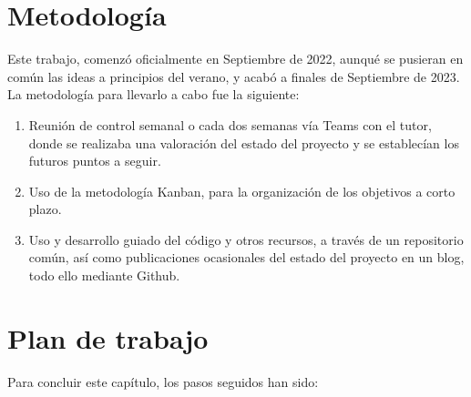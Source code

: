 \section{Metodología}
\label{sec:metodologia}

Este trabajo, comenzó oficialmente en Septiembre de 2022, aunqué se pusieran en común las ideas a principios del verano, y acabó a finales de Septiembre de 2023. La metodología para llevarlo a cabo fue la siguiente:

\begin{enumerate}
	\item Reunión de control semanal o cada dos semanas vía Teams con el tutor, donde se realizaba una valoración del estado del proyecto y se establecían los futuros puntos a seguir.
	\item Uso de la metodología Kanban, para la organización de los objetivos a corto plazo.
	\item Uso y desarrollo guiado del código y otros recursos, a través de un repositorio común, así como publicaciones ocasionales del estado del proyecto en un blog, todo ello mediante Github.
\end{enumerate}

\section{Plan de trabajo}
\label{sec:plantrabajo}

Para concluir este capítulo, los pasos seguidos han sido:

